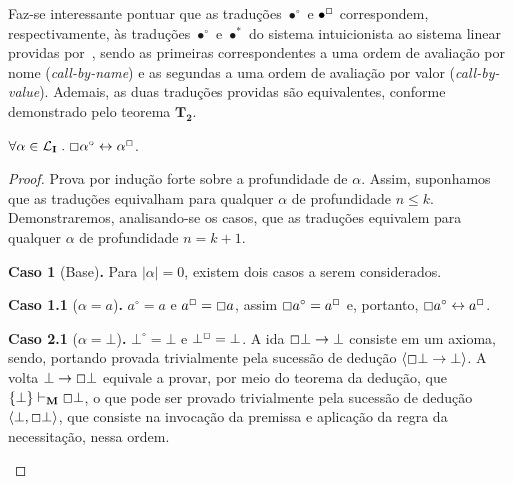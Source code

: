    Faz-se interessante pontuar que as traduções $\bullet^\circ$ e $\bullet^\Box$ correspondem, respectivamente, às traduções $\bullet^\circ$ e $\bullet^*$ do sistema intuicionista ao sistema linear providas por~\cite{Girard}, sendo as primeiras correspondentes a uma ordem de avaliação por nome (\textit{call-by-name}) e as segundas a uma ordem de avaliação por valor (\textit{call-by-value}). 
    Ademais, as duas traduções providas são equivalentes, conforme demonstrado pelo teorema $\mathbf{T_2}$.

    \begin{theorem}
        $\forall\alpha\in\mathcal{L}_\mathbf{I}\mathrel{.}\Box\alpha^\circ\leftrightarrow\alpha^\Box$.

        \begin{proof}
            Prova por indução forte sobre a profundidade de $\alpha$.
            Assim, suponhamos que as traduções equivalham para qualquer $\alpha$ de profundidade $n\leq k$.
            Demonstraremos, analisando-se os casos, que as traduções equivalem para qualquer $\alpha$ de profundidade $n=k+1$.
    
            \begin{case}
                \textbf{Caso 1} (Base)\textbf{.}
                    Para $|\alpha| = 0$, existem dois casos a serem considerados.
    
                    \begin{casee}
                        \textbf{Caso 1.1} ($\alpha = a$)\textbf{.}
                        $a^\circ = a$ e $a^\Box = \Box a$, assim $\Box a^\circ = a^\Box$ e, portanto, $\Box a^\circ \leftrightarrow a^\Box$.
                    \end{casee}

                    \begin{casee}
                        \textbf{Caso 2.1} ($\alpha = \bot$)\textbf{.}
                        $\bot^\circ = \bot$ e $\bot^\Box = \bot$. A ida $\Box\bot\to\bot$ consiste em um axioma, sendo, portando provada trivialmente pela sucessão de dedução $\langle\Box\bot\to\bot\rangle$.
                        A volta $\bot\to\Box\bot$ equivale a provar, por meio do teorema da dedução, que $\{\bot\}\vdash_\mathbf{M}\Box\bot$, o que pode ser provado trivialmente pela sucessão de dedução $\langle\bot, \Box\bot\rangle$, que consiste na invocação da premissa e aplicação da regra da necessitação, nessa ordem.
                    \end{casee}
            \end{case}
    

\end{proof}
\end{theorem}

